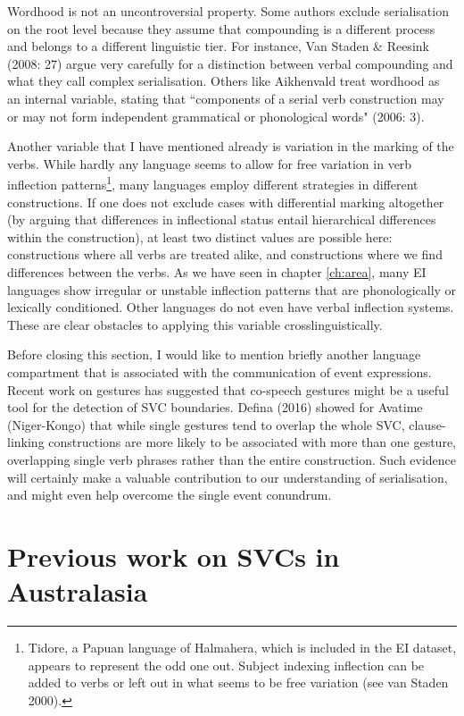 Wordhood is not an uncontroversial property. Some authors exclude serialisation on the root level because they assume that compounding is a different process and belongs to a different linguistic tier. For instance, Van Staden \& Reesink (2008: 27) argue very carefully for a distinction between verbal compounding and what they call complex serialisation. Others like Aikhenvald treat wordhood as an internal variable, stating that ``components of a serial verb construction may or may not form independent grammatical or phonological words" (2006: 3).

Another variable that I have mentioned already is variation in the marking of the verbs. While hardly any language seems to allow for free variation in verb inflection patterns\footnote{Tidore, a Papuan language of Halmahera, which is included in the EI dataset, appears to represent the odd one out. Subject indexing inflection can be added to verbs or left out in what seems to be free variation (see van Staden 2000).}, many languages employ different strategies in different constructions. If one does not exclude cases with differential marking altogether (by arguing that differences in inflectional status entail hierarchical differences within the construction), at least two distinct values are possible here: constructions where all verbs are treated alike, and constructions where we find differences between the verbs. As we have seen in  chapter \ref{ch:area}, many EI languages show irregular or unstable inflection patterns that are phonologically or lexically conditioned. Other languages do not even have verbal inflection systems. These are clear obstacles to applying this variable crosslinguistically.

Before closing this section, I would like to mention briefly another language compartment that is associated with the communication of event expressions. Recent work on gestures has suggested that co-speech gestures might be a useful tool for the detection of SVC boundaries. Defina (2016) showed for Avatime (Niger-Kongo) that while single gestures tend to overlap the whole SVC, clause-linking constructions are more likely to be associated with more than one gesture, overlapping single verb phrases rather than the entire construction. Such evidence will certainly make a valuable contribution to our understanding of serialisation, and might even help overcome the single event conundrum.

\section{Previous work on SVCs in Australasia} \label{previouswork}


